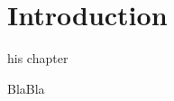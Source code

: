 \let\textcircled=\pgftextcircled
\chapter{Introduction} \label{sec:Introduction}

his chapter

BlaBla





\clearpage
